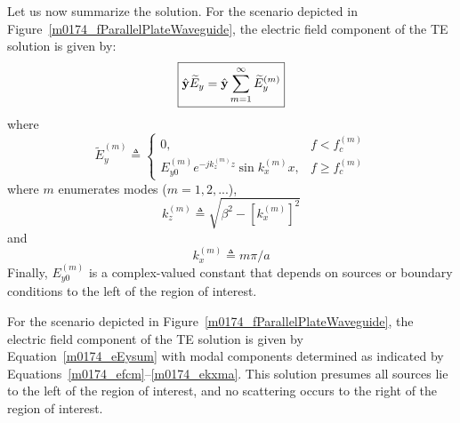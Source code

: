 Let us now summarize the solution.
For the scenario depicted in Figure~\ref{m0174_fParallelPlateWaveguide}, the electric field component of the TE solution is given by:
%
\begin{equation}
\boxed{
\hat{\bf y}\widetilde{E}_y = \hat{\bf y}\sum_{m=1}^{\infty} \widetilde{E}_y^{(m)}
}
\label{m0174_eEysum}
\end{equation}
%
where
%
\begin{equation}
\boxed{
\widetilde{E}_y^{(m)} \triangleq \begin{cases}
                                   0,                             & f<f_c^{(m)} \\
                                   E_{y0}^{(m)} e^{-jk_z^{(m)} z} \sin k_x^{(m)} x, & f\ge f_c^{(m)} 
                                 \end{cases}
}
\end{equation}
%
where $m$ enumerates modes ($m=1,2,...$),
%
\begin{equation}
\boxed{
k_z^{(m)} \triangleq \sqrt{\beta^2-\left[k_x^{(m)}\right]^2}
}
\end{equation}
%
and
%
\begin{equation}
\boxed{
k_x^{(m)} \triangleq m\pi/a 
}
\label{m0174_ekxma}
\end{equation}
%
Finally, $E_{y0}^{(m)}$ is a complex-valued constant that depends on sources or boundary conditions to the left of the region of interest.
%
\begin{mdframed}[backgroundcolor=yellow!20,nobreak=true] 
For the scenario depicted in Figure~\ref{m0174_fParallelPlateWaveguide}, the electric field component of the TE solution is given by Equation~\ref{m0174_eEysum} with modal components determined as indicated by Equations~\ref{m0174_efcm}--\ref{m0174_ekxma}.  This solution presumes all sources lie to the left of the region of interest, and no scattering occurs to the right of the region of interest.
\end{mdframed}

